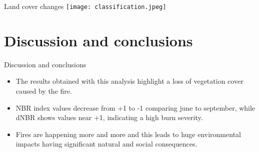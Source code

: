 \documentclass{beamer}
\begin{document}
\begin{frame}{Land cover changes}
\texttt{[image: classification.jpeg]}
\end{frame}


\section{Discussion and conclusions}
\begin{frame}{Discussion and conclusions}
\begin{itemize}
    \item The results obtained with this analysis highlight a loss of vegetation cover caused by the fire.
    \item NBR index values decrease from +1 to -1 comparing june to september, while dNBR shows values near +1, indicating a high burn severity.  
    \item Fires are happening more and more and this leads to huge environmental impacts having significant natural and social consequences.
\end{itemize}
    
\end{frame}

    
\end{document}
